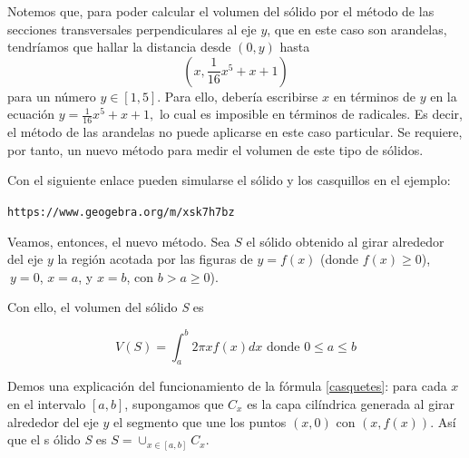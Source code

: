 
Notemos que, para poder calcular el volumen del sólido por el método de las secciones transversales perpendiculares al eje $y$, que en este caso son arandelas, tendríamos que hallar la distancia desde $\left( 0,y\right)$ hasta {\small \[\left( x,\frac{1}{16}x^{5}+x+1\right)\]} para un n\'umero $y\in \left[ 1,5\right] $. Para ello, debería escribirse $x$ en términos de $y$ en la ecuación $y=\frac{1}{16}x^{5}+x+1,$ lo cual es imposible en términos de radicales. Es decir, el método de las arandelas no puede aplicarse en este caso particular. Se requiere, por tanto, un nuevo método para medir el volumen de este tipo de sólidos.

Con el siguiente enlace pueden simularse el sólido y los casquillos en el ejemplo:


\begin{center}
	\verb"https://www.geogebra.org/m/xsk7h7bz"
\end{center}



Veamos, entonces, el nuevo método. Sea $S$ el sólido obtenido al girar alrededor del eje $y$ la región acotada por las figuras de $y=f\left( x\right) $ (donde $f\left( x\right) \geq 0$), $\ y=0$, $x=a$, y $x=b$, con $b>a\geq 0$).

Con ello, el volumen del sólido \textit{S} es

\begin{equation}\label{casquetes}
V\left( S\right) =\int_{a}^{b}2\pi xf\left( x\right) dx\text{ donde }0\leq
a\leq b
\end{equation}

Demos una explicación del funcionamiento de la fórmula \eqref{casquetes}: para cada $x$ en el intervalo $\left[ a,b\right] $, supongamos que $C_{x}$ es la capa cilíndrica generada al girar alrededor del eje\textbf{ $y$} el segmento que une los puntos $(x,0)$ con $\left( x,f\left( x\right) \right) $. Así que el s%
ólido \textit{S} es $S=\cup _{x\in \left[ a,b\right] }C_{x}.$

